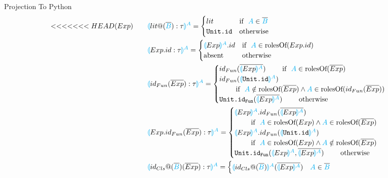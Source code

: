 \documentclass[11pt]{jarticle}
\newcommand{\projection}[2]{{\color{cyan}\llparenthesis}#1{\color{cyan}\rrparenthesis^#2}}
\newcommand{\projection}[2]{{\color{cyan}\llparenthesis}#1{\color{cyan}\rrparenthesis^#2}}
\begin{document}
Projection To Python
\begin{alignat*}{2}
<<<<<<< HEAD
  &(Exp)~~~ &&\projection{lit@(\overline{\color{cyan}{B}}):\tau}{A}=
  \begin{cases}
    lit & \text{if}~~ {\color{cyan}A} \in \overline{\color{cyan}{B}}\\
    \texttt{Unit.id} &\text{otherwise}
  \end{cases}\\
  &&&\projection{Exp.id:\tau}{A}=
  \begin{cases}
    \projection{Exp}{A}.id &\text{if}~~{\color{cyan}A} \in \text{rolesOf} (Exp.id)\\
    \text{absent} &\text{otherwise}
  \end{cases}\\
  &&&\projection{id_{Fun}(\overline{Exp}):\tau}{A} =
  \begin{cases}
    id_{Fun}(\overline{\projection{Exp}{A}}) ~~~~~~~\text{if}~~ {\color{cyan}A} \in \text{rolesOf} (\overline{Exp})\\
    id_{Fun}(\projection{\texttt{Unit.id}}{A})\\
    ~~~~~~~\text{if}~~ {\color{cyan}A} \notin \text{rolesOf}(\overline{Exp}) \wedge {\color{cyan}A} \in \text{rolesOf} (id_{Fun}(\overline{Exp}))\\
    \texttt{Unit.id}_\texttt{Fun}(\overline{\projection{Exp}{A}}) ~~~~~~~\text{otherwise}
  \end{cases}\\
  &&&\projection{Exp.id_{Fun}(\overline{Exp}):\tau}{A}=
  \begin{cases}
    \projection{Exp}{A}.id_{Fun}(\overline{\projection{Exp}{A}}) \\
    ~~~~~~~\text{if}~~ {\color{cyan}A} \in \text{rolesOf}(Exp) \wedge {\color{cyan}A} \in \text{rolesOf}(\overline{Exp})\\
    \projection{Exp}{A}.id_{Fun}(\projection{\texttt{Unit.id}}{A}) \\
    ~~~~~~~\text{if}~~ {\color{cyan}A} \in \text{rolesOf}(Exp) \wedge {\color{cyan}A} \notin \text{rolesOf}(\overline{Exp})\\
    \texttt{Unit.id}_\texttt{Fun}(\projection{Exp}{A},\overline{\projection{Exp}{A}}) ~~~~~~~\text{otherwise}
  \end{cases}\\
  &&&\projection{id_{Cls}@(\overline{\color{cyan}B})(\overline{Exp}):\tau}{A}=
  \begin{cases}
    \projection{id_{Cls}@(\overline{\color{cyan}B})}{A} (\overline{\projection{Exp}{A}}) & {\color{cyan}A} \in \overline{\color{cyan}B}\\

\end{cases}
\end{alignat*}
\end{document}
